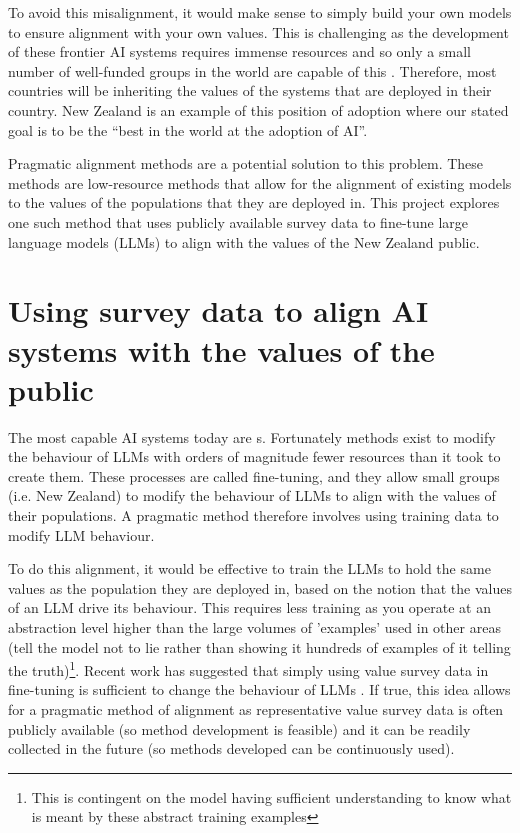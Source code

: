 To avoid this misalignment, it would make sense to simply build your own models to ensure alignment with your own values. This is challenging as the development of these frontier AI systems requires immense resources and so only a small number of well-funded groups in the world are capable of this \cite{cottierRisingCostsTraining2024}. Therefore, most countries will be inheriting the values of the systems that are deployed in their country. New Zealand is an example of this position of adoption where our stated goal is to be the ``best in the world at the adoption of AI''\cite{1newsreportersLuxonToutsBudget}.

Pragmatic alignment methods are a potential solution to this problem. These methods are low-resource methods that allow for the alignment of existing models to the values of the populations that they are deployed in. This project explores one such method that uses publicly available survey data to fine-tune large language models (LLMs) to align with the values of the New Zealand public.

\section{Using survey data to align AI systems with the values of the public}
\label{sec:project_overview}

The most capable AI systems today are s. Fortunately methods exist to modify the behaviour of LLMs with orders of magnitude fewer resources than it took to create them. These processes are called fine-tuning, and they allow small groups (i.e. New Zealand) to modify the behaviour of LLMs to align with the values of their populations. A pragmatic method therefore involves using training data to modify LLM behaviour. 

To do this alignment, it would be effective to train the LLMs to hold the same values as the population they are deployed in, based on the notion that the values of an LLM drive its behaviour. This requires less training as you operate at an abstraction level higher than the large volumes of 'examples' used in other areas (tell the model not to lie rather than showing it hundreds of examples of it telling the truth)\footnote{This is contingent on the model having sufficient understanding to know what is meant by these abstract training examples}. Recent work has suggested that simply using value survey data in fine-tuning is sufficient to change the behaviour of LLMs \cite{nieSurveytoBehaviorDownstreamAlignment2025}. If true, this idea allows for a pragmatic method of alignment as representative value survey data is often publicly available (so method development is feasible) and it can be readily collected in the future (so methods developed can be continuously used).

